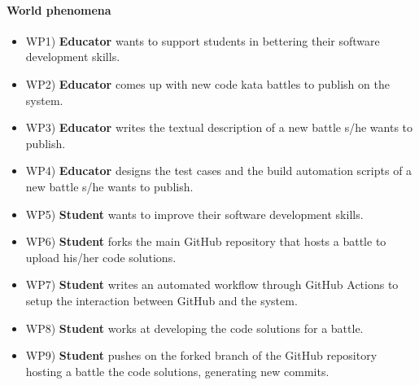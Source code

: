 	\paragraph{World phenomena}
	\begin{itemize}
		\item WP1)  \textbf{Educator} wants to support students in bettering their software development skills.
		\item WP2) \textbf{Educator} comes up with new code kata battles to publish on the system.
		\item WP3) \textbf{Educator} writes the textual description of a new battle s/he wants to publish.
		\item WP4) \textbf{Educator} designs the test cases and the build automation scripts of a new battle s/he wants to publish.
		\item WP5) \textbf{Student} wants to improve their software development skills.
		\item WP6) \textbf{Student} forks the main GitHub repository that hosts a battle to upload 	his/her code solutions.
		\item WP7) \textbf{Student} writes an automated workflow through GitHub Actions to setup the interaction between GitHub and the system.
		\item WP8) \textbf{Student} works at developing the code solutions for a battle.
		\item WP9) \textbf{Student} pushes on the forked branch of the GitHub repository hosting a 	battle the code solutions, generating new commits.
	\end{itemize}
	
